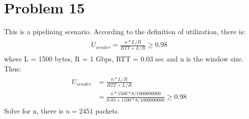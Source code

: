 \documentclass[titlepage, paper=a4, fontsize=11pt]{scrartcl} %
\numberwithin{equation}{section} %
\numberwithin{table}{section} %
\begin{document}

\section*{Problem 15}
This is a pipelining scenario. According to the definition of utilization, there is:
\begin{align*} 
\begin{split}
U_{sender} = \frac{n*L/R}{RTT+L/R} \geq 0.98
\end{split}					
\end{align*}
where L = 1500 bytes, R = 1 Gbps, RTT = 0.03 sec and n is the window size.
Thus:
\begin{align*} 
\begin{split}
U_{sender} &= \frac{n*L/R}{RTT+L/R} \\
&=  \frac{n*1500*8/1000000000}{0.03+1500*8/1000000000} \geq 0.98
\end{split}					
\end{align*}
Solve for n, there is $n=2451$ packets.
\\


\end{document}
